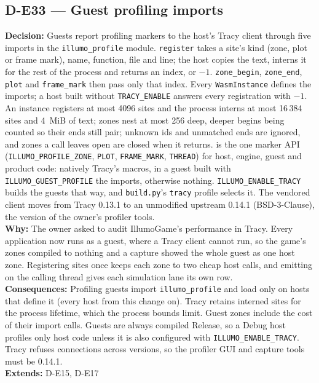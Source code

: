\subsection*{D-E33 --- Guest profiling imports}
\begin{decisionbox}[title={D-E33 \quad 2026-09-28}]
\textbf{Decision:} Guests report profiling markers to the host's Tracy
client through five imports in the \texttt{illumo\_profile} module.
\texttt{register} takes a site's kind (zone, plot or frame mark), name,
function, file and line; the host copies the text, interns it for the rest of
the process and returns an index, or $-1$. \texttt{zone\_begin},
\texttt{zone\_end}, \texttt{plot} and \texttt{frame\_mark} then pass only that
index. Every \texttt{WasmInstance} defines the imports; a host built without
\texttt{TRACY\_ENABLE} answers every registration with $-1$. An instance
registers at most 4096 sites and the process interns at most 16\,384 sites and
4~MiB of text; zones nest at most 256 deep, deeper begins being counted so
their ends still pair; unknown ids and unmatched ends are ignored, and zones a
call leaves open are closed when it returns. 
is the one marker API (\texttt{ILLUMO\_PROFILE\_ZONE}, \texttt{PLOT},
\texttt{FRAME\_MARK}, \texttt{THREAD}) for host, engine, guest and product
code: natively Tracy's macros, in a guest built with
\texttt{ILLUMO\_GUEST\_PROFILE} the imports, otherwise nothing.
\texttt{ILLUMO\_ENABLE\_TRACY} builds the guests that way, and
\texttt{build.py}'s \texttt{tracy} profile selects it. The vendored client
moves from Tracy 0.13.1 to an unmodified upstream 0.14.1 (BSD-3-Clause), the
version of the owner's profiler tools.\\
\textbf{Why:} The owner asked to audit IllumoGame's performance in Tracy.
Every application now runs as a guest, where a Tracy client cannot run, so
the game's zones compiled to nothing and a capture showed the whole guest as
one host zone. Registering sites once keeps each zone to two cheap host calls,
and emitting on the calling thread gives each simulation lane its own row.\\
\textbf{Consequences:} Profiling guests import \texttt{illumo\_profile} and
load only on hosts that define it (every host from this change on). Tracy
retains interned sites for the process lifetime, which the process bounds
limit. Guest zones include the cost of their import calls. Guests are always
compiled Release, so a Debug host profiles only host code unless it is also
configured with \texttt{ILLUMO\_ENABLE\_TRACY}. Tracy refuses connections
across versions, so the profiler GUI and capture tools must be 0.14.1.\\
\textbf{Extends:} D-E15, D-E17
\end{decisionbox}

